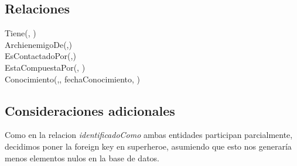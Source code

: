 \documentclass[a4paper,10pt]{article}
\begin{document}
\subsection{Relaciones}\label{relaciones}

Tiene(, )\\
ArchienemigoDe(,)\\
EsContactadoPor(,)\\
EstaCompuestaPor(, )\\
Conocimiento(,,
fechaConocimiento, )

\subsection{Consideraciones adicionales}\label{consideraciones-adicionales}

Como en la relacion \emph{identificadoComo} ambas entidades participan
parcialmente, decidimos poner la foreign key en superheroe, asumiendo
que esto nos generaría menos elementos nulos en la base de datos.
\end{document}
